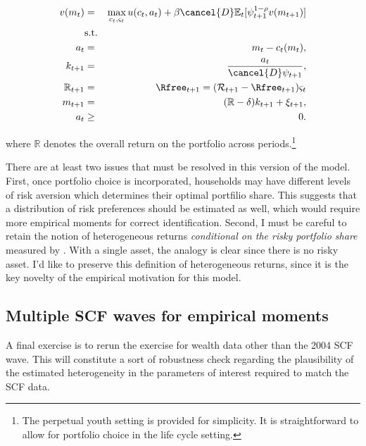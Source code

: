 \documentclass[\econtexRoot/Chp1proposal]{subfiles}
\begin{document}
\begin{eqnarray*}
  v(m_t) &=& \max_{c_t, \varsigma_t} u(c_t, a_t) + \beta \cancel{D} \mathbb{E}_{t}[\psi_{t+1}^{1-\rho}v(m_{t+1})] \\
  &\text{s.t.}& \\
  a_t &=& m_t - c_t(m_t), \\
  k_{t+1} &=& \frac{a_t}{\cancel{D}\psi_{t+1}}, \\
  \mathbb{R}_{t+1} &=& \Rfree_{t+1} = (\mathcal{R}_{t+1} - \Rfree_{t+1})\varsigma_t \\
  m_{t+1} &=& (\mathbb{R} - \delta)k_{t+1} + \xi_{t+1}, \\
  a_t &\geq& 0.
\end{eqnarray*}

\par where $\mathbb{R}$ denotes the overall return on the portfolio across periods.\footnote{The perpetual youth setting is provided for simplicity. It is straightforward to allow for portfolio choice in the life cycle setting.}

\par There are at least two issues that must be resolved in this version of the model. First, once portfolio choice is incorporated, households may have different levels of risk aversion which determines their optimal portfilio share. This suggests that a distribution of risk preferences should be estimated as well, which would require more empirical moments for correct identification. Second, I must be careful to retain the notion of heterogeneous returns \textit{conditional on the risky portfolio share} measured by \cite{aflgdmlp20}. With a single asset, the analogy is clear since there is no risky asset. I'd like to preserve this definition of heterogeneous returns, since it is the key novelty of the empirical motivation for this model.

\subsection{Multiple SCF waves for empirical moments}

\par A final exercise is to rerun the exercise for wealth data other than the 2004 SCF wave. This will constitute a sort of robustness check regarding the plausibility of the estimated heterogeneity in the parameters of interest required to match the SCF data.


\onlyinsubfile{}

\end{document}
